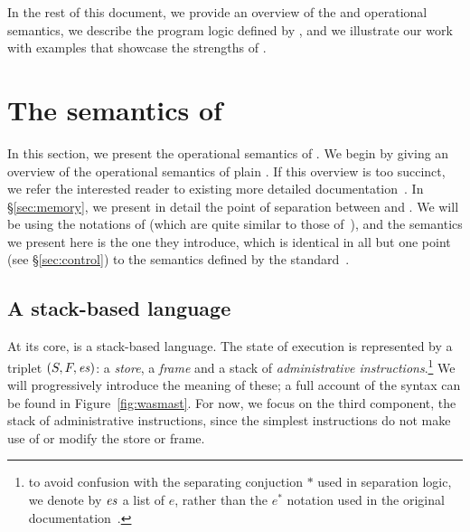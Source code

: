\documentclass[acmsmall,screen]{acmart}\settopmatter{}
\begin{document}
In the rest of this document, we provide an overview of the \wasm and \mswasm operational semantics, we describe the program logic defined by \irismswasm, and we illustrate our work with examples that showcase the strengths of \mswasm.


\section{The semantics of \mswasm}

In this section, we present the operational semantics of \mswasm. We begin by giving an overview of the operational semantics of plain \wasm. If this overview is too succinct, we refer the interested reader to existing more detailed documentation~\cite{wasm}. In \S\ref{sec:memory}, we present in detail the point of separation between \wasm and \mswasm. We will be using the notations of \citet{iriswasm} (which are quite similar to those of~\citet{wasm}), and the semantics we present here is the one they introduce, which is identical in all but one point (see \S\ref{sec:control}) to the semantics defined by the standard~\cite{wasm}.

\subsection{A stack-based language}

At its core, \wasm is a stack-based language. The state of execution is represented by a triplet \( (S, F, \mathit{es}) \): a \emph{store}, a \emph{frame} and a stack of \emph{administrative instructions}.\footnote{to avoid confusion with the separating conjuction \( \ast \) used in separation logic, we denote by \( \mathit{es} \) a list of \( e \), rather than the \( e^\ast \) notation used in the original \wasm documentation~\cite{wasm}.}
We will progressively introduce the meaning of these; a full account of the syntax can be found in Figure~\ref{fig:wasmast}. For now, we focus on the third component, the stack of administrative instructions, since the simplest \wasm instructions do not make use of or modify the store or frame.
\end{document}
